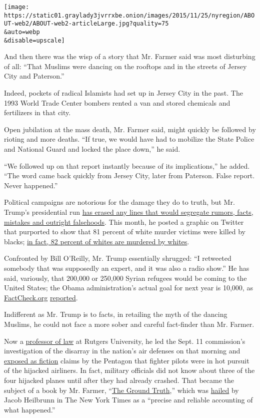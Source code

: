 \texttt{[image: https://static01.graylady3jvrrxbe.onion/images/2015/11/25/nyregion/ABOUT-web2/ABOUT-web2-articleLarge.jpg?quality=75\\\&auto=webp\\\&disable=upscale]}

And then there was the wisp of a story that Mr. Farmer said was most
disturbing of all: ``That Muslims were dancing on the rooftops and in
the streets of Jersey City and Paterson.''

Indeed, pockets of radical Islamists had set up in Jersey City in the
past. The 1993 World Trade Center bombers rented a van and stored
chemicals and fertilizers in that city.

Open jubilation at the mass death, Mr. Farmer said, might quickly be
followed by rioting and more deaths. ``If true, we would have had to
mobilize the State Police and National Guard and locked the place
down,'' he said.

``We followed up on that report instantly because of its implications,''
he added. ``The word came back quickly from Jersey City, later from
Paterson. False report. Never happened.''

Political campaigns are notorious for the damage they do to truth, but
Mr. Trump's presidential run
\href{http://www.politifact.com/personalities/donald-trump/}{has erased
any lines that would segregate rumors, facts, mistakes and outright
falsehoods}. This month, he posted a graphic on Twitter that purported
to show that 81 percent of white murder victims were killed by blacks;
\href{http://www.factcheck.org/2015/11/trump-retweets-bogus-crime-graphic/}{in
fact, 82 percent of whites are murdered by whites}.

Confronted by Bill O'Reilly, Mr. Trump essentially shrugged: ``I
retweeted somebody that was supposedly an expert, and it was also a
radio show.'' He has said, variously, that 200,000 or 250,000 Syrian
refugees would be coming to the United States; the Obama
administration's actual goal for next year is 10,000, as
\href{http://FactCheck.Org}{FactCheck.org}
\href{http://www.factcheck.org/2015/10/trump-gets-refugee-numbers-wrong/}{reported}.

Indifferent as Mr. Trump is to facts, in retailing the myth of the
dancing Muslims, he could not face a more sober and careful fact-finder
than Mr. Farmer.

Now a
\href{https://law.newark.rutgers.edu/faculty/faculty-profiles/john-j-farmer-jr}{professor
of law} at Rutgers University, he led the Sept. 11 commission's
investigation of the disarray in the nation's air defenses on that
morning and
\href{http://www.nytimes3xbfgragh.onion/2011/09/08/nyregion/newly-published-audio-provides-real-time-view-of-911-attacks.html}{exposed
as fiction} claims by the Pentagon that fighter pilots were in hot
pursuit of the hijacked airliners. In fact, military officials did not
know about three of the four hijacked planes until after they had
already crashed. That became the subject of a book by Mr. Farmer,
``\href{http://www.johnfarmerbooks.com/}{The Ground Truth},'' which was
\href{http://www.nytimes3xbfgragh.onion/2009/11/15/books/review/Heilbrunn-t.html}{hailed}
by Jacob Heilbrunn in The New York Times as a ``precise and reliable
accounting of what happened.''

